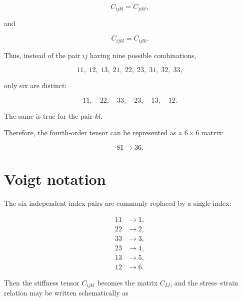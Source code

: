 \documentclass[11pt]{article}
\begin{document}
\begin{equation}
    C_{ijkl} = C_{jikl},
\end{equation}

and

\begin{equation}
    C_{ijkl} = C_{ijlk}.
\end{equation}

Thus, instead of the pair $ij$ having nine possible combinations,

\[
11,\;12,\;13,\;21,\;22,\;23,\;31,\;32,\;33,
\]

only six are distinct:

\[
11,\quad 22,\quad 33,\quad 23,\quad 13,\quad 12.
\]

The same is true for the pair $kl$.

Therefore, the fourth-order tensor can be represented as a $6\times 6$ matrix:

\begin{equation}
    81 \longrightarrow 36.
\end{equation}

\section{Voigt notation}

The six independent index pairs are commonly replaced by a single index:

\begin{equation}
\begin{aligned}
    11 &\rightarrow 1,\\
    22 &\rightarrow 2,\\
    33 &\rightarrow 3,\\
    23 &\rightarrow 4,\\
    13 &\rightarrow 5,\\
    12 &\rightarrow 6.
\end{aligned}
\end{equation}

Then the stiffness tensor $C_{ijkl}$ becomes the matrix $C_{IJ}$, and the stress--strain relation may be written schematically as
\end{document}
